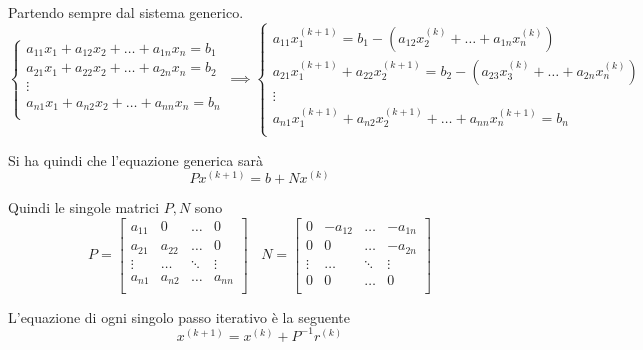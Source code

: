 Partendo sempre dal sistema generico.
\begin{equation}
    \begin{cases}
        a_{11}x_1 + a_{12} x_2 + \dots + a_{1n} x_n= b_1 \\
        a_{21}x_1 + a_{22} x_2 + \dots + a_{2n} x_n= b_2 \\
        \vdots                                           \\
        a_{n1}x_1 + a_{n2} x_2 + \dots + a_{nn} x_n= b_n \\
    \end{cases} \implies
    \begin{cases}
        a_{11}x_1^{(k+1)} = b_1 - (a_{12} x_2^{(k)} + \dots + a_{1n} x_n^{(k)})\\
        a_{21}x_1^{(k+1)} + a_{22} x_2^{(k+1)}= b_2 - (a_{23} x_3^{(k)}+ \dots + a_{2n} x_n^{(k)}) \\
        \vdots                                           \\
        a_{n1}x_1^{(k+1)} + a_{n2} x_2^{(k+1)} + \dots + a_{nn} x_n^{(k+1)}= b_n \\
    \end{cases}
\end{equation}

Si ha quindi che l'equazione generica sarà
$$Px^{(k+1)}= b+Nx^{(k)}$$

Quindi le singole matrici $P,N$ sono
\begin{equation*}
    P= \left[\begin{array}{cccc}
        a_{11} & 0 & \dots & 0\\
        a_{21} & a_{22} & \dots & 0\\
        \vdots & \dots & \ddots & \vdots\\
        a_{n1} & a_{n2} & \dots & a_{nn}\\
    \end{array}\right]
    \ \ \ \
    N= \left[\begin{array}{cccc}
        0 & -a_{12} & \dots & -a_{1n}\\
        0 & 0 & \dots & -a_{2n}\\
        \vdots & \dots & \ddots & \vdots\\
        0 & 0 & \dots & 0\\
    \end{array}\right]
\end{equation*}

L'equazione di ogni singolo passo iterativo è la seguente
$$x^{(k+1)} = x^{(k)}+P^{-1}r^{(k)}$$

